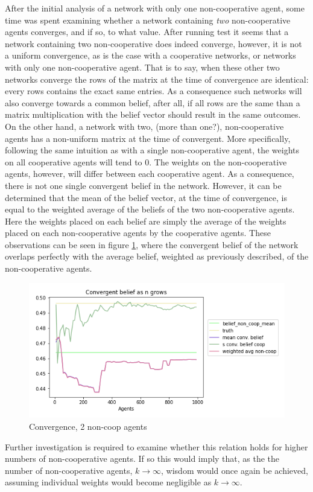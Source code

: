 \documentclass{article}
\begin{document}
After the initial analysis of a network with only one non-cooperative agent, some time was spent examining whether a network containing \emph{two} non-cooperative agents converges, and if so, to what value. After running test it seems that a network containing two non-cooperative does indeed converge, however, it is not a uniform convergence, as is the case with a cooperative networks, or networks with only one non-cooperative agent. That is to say, when these other two networks converge the rows of the matrix at the time of convergence are identical: every rows contains the exact same entries. As a consequence such networks will also converge towards a common belief, after all, if all rows are the same than a matrix multiplication with the belief vector should result in the same outcomes. On the other hand, a network with two, (more than one?), non-cooperative agents has a non-uniform matrix at the time of convergent. More specifically, following the same intuition as with a single non-cooperative agent, the weights on all cooperative agents will tend to 0. The weights on the non-cooperative agents, however, will differ between each cooperative agent.
As a consequence, there is not one single convergent belief in the network. However, it can be determined that the mean of the belief vector, at the time of convergence, is equal to the weighted average of the beliefs of the two non-cooperative agents. Here the weights placed on each belief are simply the average of the weights placed on each non-cooperative agents by the cooperative agents. These observations can be seen in figure \ref{non-coop:double}, where the convergent belief of the network overlaps perfectly with the average belief, weighted as previously described, of the non-cooperative agents. 

\begin{center}
    \begin{figure}[!htbp]
        \centering
        \includegraphics[width=.8\textwidth]{ThesisKI/Images/double_non_coop_convergence.png}
        \caption{Convergence, 2 non-coop agents}
        \label{non-coop:double}
    \end{figure}
\end{center}

Further investigation is required to examine whether this relation holds for higher numbers of non-cooperative agents. If so this would imply that, as the the number of non-cooperative agents, $k \to \infty$, wisdom would once again be achieved, assuming individual weights would become negligible as $k \to \infty$.

\newpage
\end{document}
